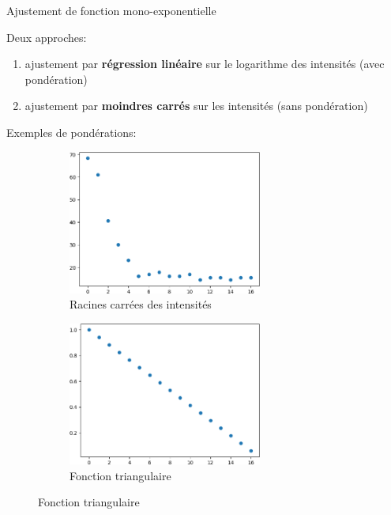 \documentclass[10pt]{beamer}
\begin{document}
\begin{frame}{Ajustement de fonction mono-exponentielle}

  Deux approches:
  \begin{enumerate}
  \item ajustement par \textbf{régression linéaire} sur le logarithme des intensités (avec pondération)
  \item ajustement par \textbf{moindres carrés} sur les intensités (sans pondération)
  \end{enumerate}

  Exemples de pondérations:

  \begin{figure}[ht]
    \centering
    \begin{subfigure}[t]{0.5\textwidth}
      \centering
      \includegraphics[width=0.7\textwidth]{fig/poids_sqrt}
      \caption{Racines carrées des intensités}
      \label{subfig:poids_sqrt}
    \end{subfigure}%
    \begin{subfigure}[t]{0.5\textwidth}
      \centering
      \includegraphics[width=0.7\textwidth]{fig/poids_triangle}
      \caption{Fonction triangulaire}
      \label{subfig:poids_triangle}
    \end{subfigure}%

  \end{figure}

\end{frame}
\end{document}
